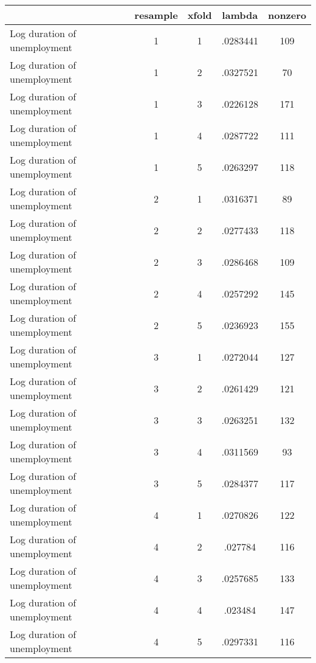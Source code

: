 \begin{tabular}{l*{4}{c}}
\hline\hline
                    &    resample&       xfold&      lambda&     nonzero\\
\hline
Log duration of unemployment&           1&           1&    .0283441&         109\\
Log duration of unemployment&           1&           2&    .0327521&          70\\
Log duration of unemployment&           1&           3&    .0226128&         171\\
Log duration of unemployment&           1&           4&    .0287722&         111\\
Log duration of unemployment&           1&           5&    .0263297&         118\\
Log duration of unemployment&           2&           1&    .0316371&          89\\
Log duration of unemployment&           2&           2&    .0277433&         118\\
Log duration of unemployment&           2&           3&    .0286468&         109\\
Log duration of unemployment&           2&           4&    .0257292&         145\\
Log duration of unemployment&           2&           5&    .0236923&         155\\
Log duration of unemployment&           3&           1&    .0272044&         127\\
Log duration of unemployment&           3&           2&    .0261429&         121\\
Log duration of unemployment&           3&           3&    .0263251&         132\\
Log duration of unemployment&           3&           4&    .0311569&          93\\
Log duration of unemployment&           3&           5&    .0284377&         117\\
Log duration of unemployment&           4&           1&    .0270826&         122\\
Log duration of unemployment&           4&           2&     .027784&         116\\
Log duration of unemployment&           4&           3&    .0257685&         133\\
Log duration of unemployment&           4&           4&     .023484&         147\\
Log duration of unemployment&           4&           5&    .0297331&         116\\

\end{tabular}
